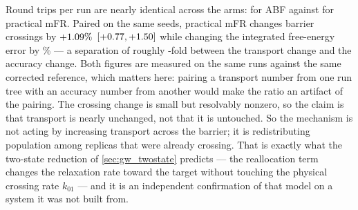 \begin{remark}
\label{rem:wca_roundtrips}
Round trips per run are nearly identical across the arms: \WcvAbfRoundTrips{} for ABF against
\WcvEstRoundTrips{} for practical mFR. Paired on the same seeds, practical mFR changes barrier
crossings by $+1.09\%$
$[+0.77, +1.50]$ while changing the integrated
free-energy error by \WcvEstGain\% --- a separation of roughly
\WcvRoundTripSeparation-fold between the transport change and the accuracy change. Both
figures are measured on the same runs against the same corrected reference, which matters
here: pairing a transport number from one run tree with an accuracy number from another would
make the ratio an artifact of the pairing. The crossing change is small but resolvably
nonzero, so the claim is that transport is nearly unchanged, not that it is untouched. So
the mechanism is not acting by increasing transport across the barrier; it is redistributing
population among replicas that were already crossing. That is exactly what the two-state
reduction of \cref{sec:gw_twostate} predicts --- the reallocation term changes the relaxation
rate toward the target without touching the physical crossing rate $k_{01}$ --- and it is an
independent confirmation of that model on a system it was not built from.
\end{remark}

